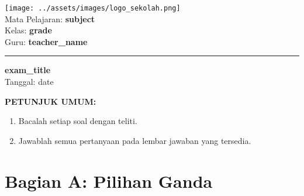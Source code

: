 \documentclass[a4paper]{article}
\begin{document}
\begin{center}
    \texttt{[image: ../assets/images/logo\_sekolah.png]} \\ %
    \vspace{0.5cm} %
    {\large Mata Pelajaran: \textbf{ {{ subject }} }} \\
    {\large Kelas: \textbf{ {{ grade }} }} \\
    {\large Guru: \textbf{ {{ teacher_name }} }} \\
    \vspace{0.2cm}
    \rule{\textwidth}{1pt} %
    \vspace{0.2cm}
    {\Large \textbf{ {{ exam_title }} }} \\
    {\small Tanggal: {{ date }} }
\end{center}

\vspace{1cm}

\textbf{PETUNJUK UMUM:}
\begin{enumerate}
    \item Bacalah setiap soal dengan teliti.
    \item Jawablah semua pertanyaan pada lembar jawaban yang tersedia.
\end{enumerate}

\section*{Bagian A: Pilihan Ganda}
\end{document}

